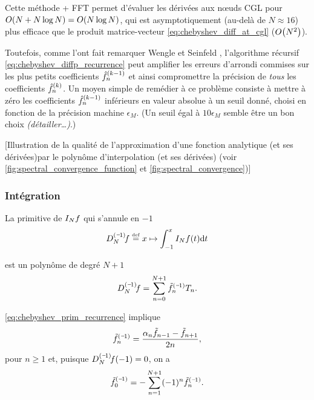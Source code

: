 Cette méthode + FFT permet d'évaluer les dérivées aux n\oe uds CGL pour $\bigO{N + N \log N} = \bigO{N \log N}$, qui est asymptotiquement (au-delà de $N \approx 16$) plus efficace que le produit matrice-vecteur \eqref{eq:chebyshev_diff_at_cgl} ($\bigO{N^2}$).
\par
Toutefois, comme l'ont fait remarquer Wengle et Seinfeld \cite{wengle1978}, l'algorithme récursif \eqref{eq:chebyshev_diffp_recurrence} peut amplifier les erreurs d'arrondi commises sur les plus petits coefficients $\deriv{\hat{f}}{k-1}_{n}$ et ainsi compromettre la précision de \emph{tous} les coefficients $\deriv{\hat{f}}{k}_{n}$. 
Un moyen simple de remédier à ce problème consiste à mettre à zéro les coefficients $\deriv{\hat{f}}{k-1}_{n}$ inférieurs en valeur absolue à un seuil donné, choisi en fonction de la précision machine $\epsilon_M$. 
(Un seuil égal à $10 \epsilon_M$ semble être un bon choix \textit{(détailler\ldots)}.)

\par\bigskip

[Illustration de la qualité de l'approximation d'une fonction analytique (et ses dérivées)par le polynôme d'interpolation (et ses dérivées) (voir \autoref{fig:spectral_convergence_function} et \autoref{fig:spectral_convergence})]






\subsubsection{Intégration}
\label{section:clenshaw_curtis_quadrature}
La primitive de $\interpolant{f}{N}$ qui s'annule en $-1$
\begin{equation}
	\interpprim{f}{N} \defini{=} x \mapsto \int_{-1}^{x} \interpolant{f}{N}(t) \dx{t}
\end{equation}

est un polynôme de degré $N+1$
\begin{equation}
	\interpprim{f}{N} = \sum_{n=0}^{N+1} \prim{\tilde{f}}{1}_n T_n.
\end{equation}

\eqref{eq:chebyshev_prim_recurrence} implique 
\begin{equation}
	\prim{\tilde{f}}{1}_n = \frac{\alpha_n \tilde{f}_{n-1} - \tilde{f}_{n+1}}{2n},
\end{equation}
pour $n \geq 1$ et, puisque $\interpprim{f}{N}(-1) = 0$, on a
\begin{equation}
	\prim{\tilde{f}}{1}_0 = - \sum_{n=1}^{N+1} (-1)^n \prim{\tilde{f}}{1}_n.
\end{equation}

